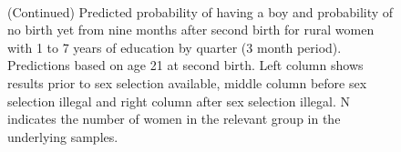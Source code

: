 \documentclass[12pt,letterpaper]{article}
\begin{document}
\begin{figure}[htpb]
{\begin{minipage}{0.31\textwidth}
        \captionsetup[subfigure]{labelformat=empty,position=top,captionskip=-1pt,farskip=-0.5pt}
        \\
        \captionsetup[subfigure]{labelformat=parens}
    \end{minipage}
}
\setcounter{subfigure}{6}
\caption{(Continued) Predicted probability of having a boy and probability of
no birth yet from nine months after second birth for rural
women with 1 to 7 years of education by quarter (3 month period). 
Predictions based on age 21 at second birth.
Left column shows results prior to sex selection available, middle column before
sex selection illegal and right column after sex selection illegal.
N indicates the number of women in the relevant group in the underlying samples.
}
\end{figure}





\end{document}
